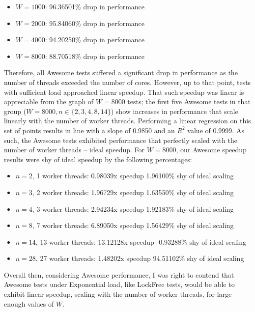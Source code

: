 \documentclass[]{article}
\begin{document}
\begin{itemize}
	\item$W = 1000$: 96.36501\% drop in performance
	\item$W = 2000$: 95.84060\% drop in performance
	\item$W = 4000$: 94.20250\% drop in performance
	\item$W = 8000$: 88.70518\% drop in performance
	\\
\end{itemize}
Therefore, all Awesome tests suffered a significant drop in performance as the number of threads exceeded the number of cores. However, up to that point, tests with sufficient load approached linear speedup. That such speedup was linear is appreciable from the graph of $W = 8000$ tests; the first five Awesome tests in that group ($W= 8000, n \in \{2, 3, 4, 8, 14\}$) show increases in performance that scale linearly with the number of worker threads. Performing a linear regression on this set of points results in line with a slope of 0.9850 and an $R^2$ value of  0.9999. As such, the Awesome tests exhibited performance that perfectly scaled with the number of worker threads -- ideal speedup. For $W = 8000$, our Awesome speedup results were shy of ideal speedup by the following percentages:
\begin{itemize}
	\item$n = 2$, 1 worker threads: 0.98039x speedup 1.96100\% shy of ideal scaling
	\item$n = 3$, 2 worker threads: 1.96729x speedup 1.63550\% shy of ideal scaling
	\item$n = 4$, 3 worker threads: 2.94234x speedup 1.92183\% shy of ideal scaling
	\item$n = 8$, 7 worker threads: 6.89050x speedup 1.56429\% shy of ideal scaling
	\item$n = 14$, 13 worker threads: 13.12128x speedup -0.93288\% shy of ideal scaling
	\item$n = 28$, 27 worker threads: 1.48202x speedup 94.51102\% shy of ideal scaling
\end{itemize}
Overall then, considering Awesome performance, I was right to contend that Awesome tests under Exponential load, like LockFree tests, would be able to exhibit linear speedup, scaling with the number of worker threads, for large enough values of $W$.
\\\\
\end{document}
